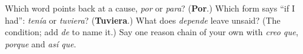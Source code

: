 \begin{tcolorbox}[breakable,colback=teal!4,colframe=teal!35!black,title={Before you move on}]
Which word points back at a cause, \emph{por} or \emph{para}? (\textbf{Por}.) Which form says \textquotedblleft{}if I had\textquotedblright{}: \emph{tenía} or \emph{tuviera}? (\textbf{Tuviera}.) What does \emph{depende} leave unsaid? (The condition; add \emph{de} to name it.) Say one reason chain of your own with \emph{creo que}, \emph{porque} and \emph{así que}.
\end{tcolorbox}
